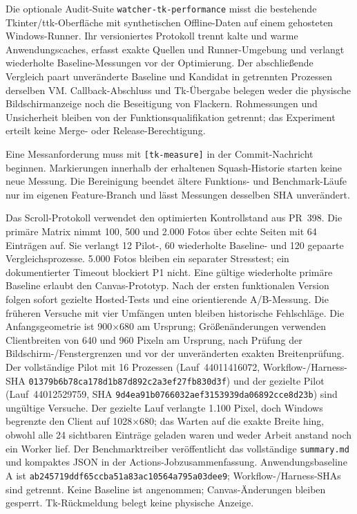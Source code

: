 \documentclass[11pt,a4paper]{article}
\newcommand{\codeword}[1]{\nolinkurl{#1}}
\begin{document}
Die optionale Audit-Suite \codeword{watcher-tk-performance} misst die
bestehende Tkinter/ttk-Oberfläche mit synthetischen Offline-Daten auf einem
gehosteten Windows-Runner. Ihr versioniertes Protokoll trennt kalte und warme
Anwendungscaches, erfasst exakte Quellen und Runner-Umgebung und verlangt
wiederholte Baseline-Messungen vor der Optimierung. Der abschließende Vergleich
paart unveränderte Baseline und Kandidat in getrennten Prozessen derselben VM.
Callback-Abschluss und Tk-Übergabe belegen weder die physische Bildschirmanzeige
noch die Beseitigung von Flackern. Rohmessungen und Unsicherheit bleiben von der
Funktionsqualifikation getrennt; das Experiment erteilt keine Merge- oder
Release-Berechtigung.

Eine Messanforderung muss mit \codeword{[tk-measure]} in der Commit-Nachricht
beginnen. Markierungen innerhalb der erhaltenen Squash-Historie starten keine
neue Messung. Die Bereinigung beendet ältere Funktions- und Benchmark-Läufe nur
im eigenen Feature-Branch und lässt Messungen desselben SHA unverändert.

Das Scroll-Protokoll verwendet den optimierten Kontrollstand aus PR~398.
Die primäre Matrix nimmt 100, 500 und 2.000 Fotos über echte Seiten mit
64 Einträgen auf. Sie verlangt 12 Pilot-, 60 wiederholte Baseline- und
120 gepaarte Vergleichsprozesse. 5.000 Fotos bleiben ein separater Stresstest;
ein dokumentierter Timeout blockiert P1 nicht. Eine gültige wiederholte
primäre Baseline erlaubt den Canvas-Prototyp. Nach der ersten funktionalen
Version folgen sofort gezielte Hosted-Tests und eine orientierende A/B-Messung.
Die früheren Versuche mit vier Umfängen unten bleiben historische Fehlschläge. Die Anfangsgeometrie ist
900×680 am Ursprung; Größenänderungen verwenden Clientbreiten von 640 und
960 Pixeln am Ursprung, nach Prüfung der Bildschirm-/Fenstergrenzen und vor
der unveränderten exakten Breitenprüfung. Der vollständige Pilot mit 16
Prozessen (Lauf~44011416072, Workflow-/Harness-SHA
\codeword{01379b6b78ca178d1b87d892c2a3ef27fb830d3f}) und der gezielte Pilot
(Lauf~44012529759, SHA \codeword{9d4ea91b0766032aef3153939da06892cce8d23b})
sind ungültige Versuche. Der gezielte Lauf verlangte 1.100 Pixel, doch Windows
begrenzte den Client auf 1028×680; das Warten auf die exakte Breite hing,
obwohl alle 24 sichtbaren Einträge geladen waren und weder Arbeit anstand noch
ein Worker lief. Der Benchmarktreiber veröffentlicht das vollständige
\codeword{summary.md} und kompaktes JSON in der Actions-Jobzusammenfassung.
Anwendungsbaseline A ist \codeword{ab245719ddf65ccba51a83ac10564a795a03dee9};
Workflow-/Harness-SHAs sind getrennt. Keine Baseline ist angenommen;
Canvas-Änderungen bleiben gesperrt. Tk-Rückmeldung belegt keine physische Anzeige.
\end{document}
